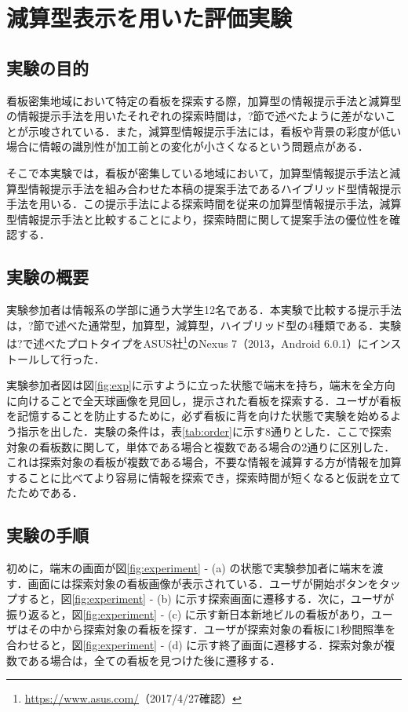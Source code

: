 \chapter{減算型表示を用いた評価実験}
\label{chapter:experiment_dr}
\section{実験の目的}
  看板密集地域において特定の看板を探索する際，加算型の情報提示手法と減算型の情報提示手法を用いたそれぞれの探索時間は，?節で述べたように差がないことが示唆されている．また，減算型情報提示手法には，看板や背景の彩度が低い場合に情報の識別性が加工前との変化が小さくなるという問題点がある．

  そこで本実験では，看板が密集している地域において，加算型情報提示手法と減算型情報提示手法を組み合わせた本稿の提案手法であるハイブリッド型情報提示手法を用いる．この提示手法による探索時間を従来の加算型情報提示手法，減算型情報提示手法と比較することにより，探索時間に関して提案手法の優位性を確認する．



\section{実験の概要}
  実験参加者は情報系の学部に通う大学生12名である．本実験で比較する提示手法は，?節で述べた通常型，加算型，減算型，ハイブリッド型の4種類である．実験は?で述べたプロトタイプをASUS社\footnote{\url{https://www.asus.com/}（2017/4/27確認）}のNexus 7（2013，Android 6.0.1）にインストールして行った．

  実験参加者図は図\ref{fig:exp}に示すように立った状態で端末を持ち，端末を全方向に向けることで全天球画像を見回し，提示された看板を探索する．ユーザが看板を記憶することを防止するために，必ず看板に背を向けた状態で実験を始めるよう指示を出した．実験の条件は，表\ref{tab:order}に示す8通りとした．ここで探索対象の看板数に関して，単体である場合と複数である場合の2通りに区別した．これは探索対象の看板が複数である場合，不要な情報を減算する方が情報を加算することに比べてより容易に情報を探索でき，探索時間が短くなると仮説を立てたためである．

\section{実験の手順}
  初めに，端末の画面が図\ref{fig:experiment} - (a) の状態で実験参加者に端末を渡す．画面には探索対象の看板画像が表示されている．ユーザが開始ボタンをタップすると，図\ref{fig:experiment} - (b) に示す探索画面に遷移する．次に，ユーザが振り返ると，図\ref{fig:experiment} - (c) に示す新日本新地ビルの看板があり，ユーザはその中から探索対象の看板を探す．ユーザが探索対象の看板に1秒間照準を合わせると，図\ref{fig:experiment} - (d) に示す終了画面に遷移する．探索対象が複数である場合は，全ての看板を見つけた後に遷移する．

